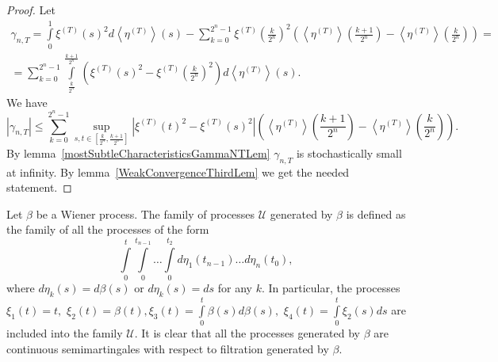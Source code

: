 \documentclass[12pt, a4paper, titlepage]{article}
\begin{document}
\begin{proof}
Let
 \begin{multline*}\gamma_{n, T}=
 \int\limits_0^1 \xi^{(T)}(s)^2d\left<\eta^{(T)}\right>(s)-
 \sum\limits_{k=0}^{2^n-1}\xi^{(T)}\left(\frac{k}{2^n}\right)^2\left(\left<\eta^{(T)}\right>
 \left(\frac{k+1}{2^n}\right)-\left<\eta^{(T)}\right>\left(\frac{k}{2^n}\right)\right)=\\=
 \sum\limits_{k=0}^{2^n-1}
 \int\limits_{\frac{k}{2^n}}^{\frac{k+1}{2^n}}
 \left(\xi^{(T)}(s)^2-\xi^{(T)}\left(\frac{k}{2^n}\right)^2\right)d\left<\eta^{(T)}\right>(s).
 \end{multline*} 
We have
$$
|\gamma_{n, T}| \le 
\sum\limits_{k=0}^{2^n-1}
 \sup\limits_{s, t \in [\frac{k}{2^n}, \frac{k+1}{2^n}]}
  \left|\xi^{(T)}(t)^2-\xi^{(T)}(s)^2\right|
 \left(
 \left<\eta^{(T)}\right>\left(\frac{k+1}{2^n}\right)-\left<\eta^{(T)}\right>\left(\frac{k}{2^n}\right)
 \right).
$$
  By lemma~\ref{mostSubtleCharacteristicsGammaNTLem} $\gamma_{n,T}$
is stochastically small at infinity.  
 By lemma~\ref{WeakConvergenceThirdLem} we get the needed statement. 
\end{proof}

\begin{definition}
Let $\beta$ be a Wiener process. The family of processes $\mathcal U$ generated by $\beta$
is defined as the family of all the processes of the form
$$\int\limits_0^t \int\limits_0^{t_{n-1}} \ldots \int\limits_0^{t_2} d\eta_1(t_{n-1}) \ldots d\eta_n(t_0),$$
where $d\eta_k(s)=d\beta(s)$ or $d\eta_k(s)=ds$
for any $k$.
In particular, the processes
$\xi_1(t)=t,$  
$\xi_2(t)=\beta(t), \xi_3(t)=\int\limits_0^t \beta(s)d\beta(s),$
$\xi_4(t)=\int\limits_0^t \xi_2(s) ds$
are included into the family $\mathcal U$. 
It is clear that all the processes generated by $\beta$
are continuous semimartingales with respect to filtration
generated by $\beta$.
\end{definition}
\end{document}
